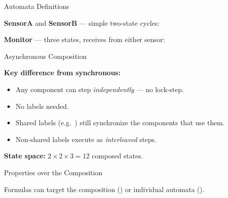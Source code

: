 \begin{frame}[fragile]{Automata Definitions}

\textbf{SensorA} and \textbf{SensorB} --- simple two-state cycles:



\textbf{Monitor} --- three states, receives from either sensor:



\end{frame}

\begin{frame}[fragile]{Asynchronous Composition}



\vspace{0.5em}
\textbf{Key difference from synchronous:}
\begin{itemize}
  \item Any component can step \emph{independently} --- no lock-step.
  \item No  labels needed.
  \item Shared labels (e.g.\ ) still synchronize the components that use them.
  \item Non-shared labels execute as \emph{interleaved} steps.
\end{itemize}

\vspace{0.5em}
\textbf{State space:} $2 \times 2 \times 3 = 12$ composed states.

\end{frame}

\begin{frame}[fragile]{Properties over the Composition}



Formulas can target the composition () or individual automata ().

\end{frame}

